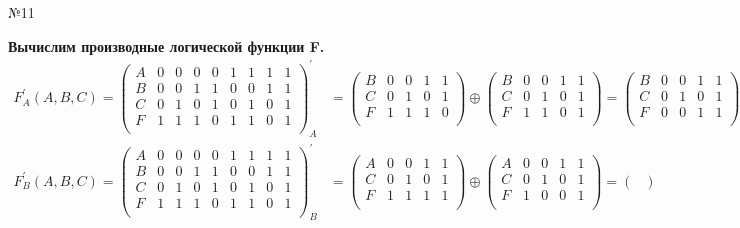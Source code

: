 \documentclass[]{article}
\begin{document}
	
	\begin{center}\begin{large}{№11}\end{large}\end{center}
	\textbf{Вычислим производные логической функции F.}
	\[
	\begin{aligned}
		F^{'}_A(A,B,C)=
		\begin{pmatrix}
			A&0&0&0&0&1&1&1&1\\
			B&0&0&1&1&0&0&1&1\\
			C&0&1&0&1&0&1&0&1\\
			F&1&1&1&0&1&1&0&1\\
		\end{pmatrix}^{'}_A
		&=
		\begin{pmatrix}
			B&0&0&1&1\\
			C&0&1&0&1\\
			F&1&1&1&0\\
		\end{pmatrix}
		\oplus
		\begin{pmatrix}
			B&0&0&1&1\\
			C&0&1&0&1\\
			F&1&1&0&1\\
		\end{pmatrix}
		=
		\begin{pmatrix}
		B&0&0&1&1\\
		C&0&1&0&1\\
		F&0&0&1&1\\
		\end{pmatrix}
		=
		B 
		\\
		F^{'}_B(A,B,C)=
		\begin{pmatrix}
			A&0&0&0&0&1&1&1&1\\
			B&0&0&1&1&0&0&1&1\\
			C&0&1&0&1&0&1&0&1\\
			F&1&1&1&0&1&1&0&1\\
		\end{pmatrix}^{'}_B
		&=
		\begin{pmatrix}
			A&0&0&1&1\\
			C&0&1&0&1\\
			F&1&1&1&1\\
		\end{pmatrix}
		\oplus
		\begin{pmatrix}
			A&0&0&1&1\\
			C&0&1&0&1\\
			F&1&0&0&1\\
		\end{pmatrix}
		=
		\begin{pmatrix}

\end{pmatrix}
\end{aligned}\]
\end{document}
